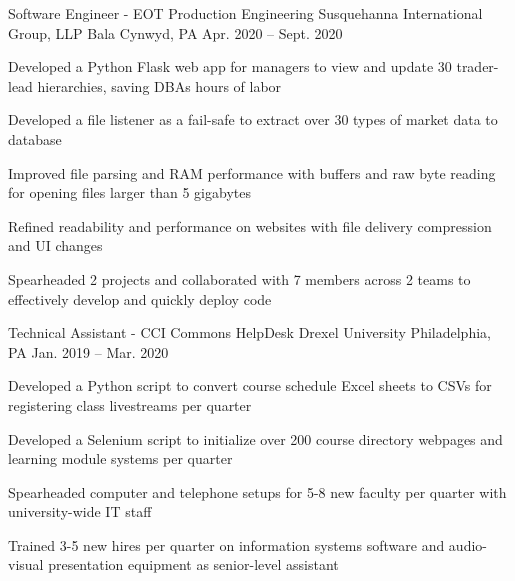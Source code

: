 

\begin{cventries}

  \cventry
  {Software Engineer - EOT Production Engineering} %
  {Susquehanna International Group, LLP} %
  {Bala Cynwyd, PA} %
  {Apr. 2020 -- Sept. 2020} %
  {
    \begin{cvitems} %
      \item {Developed a Python Flask web app for managers to view and update 30 trader-lead hierarchies, saving DBAs hours of labor}
      \item {Developed a file listener as a fail-safe to extract over 30 types of market data to database}
      \item {Improved file parsing and RAM performance with buffers and raw byte reading for opening files larger than 5 gigabytes}
      \item {Refined readability and performance on websites with file delivery compression and UI changes}
      \item {Spearheaded 2 projects and collaborated with 7 members across 2 teams to effectively develop and quickly deploy code}
    \end{cvitems}
  }

  \cventry
  {Technical Assistant - CCI Commons HelpDesk} %
  {Drexel University} %
  {Philadelphia, PA} %
  {Jan. 2019 -- Mar. 2020} %
  {
    \begin{cvitems} %
      \item {Developed a Python script to convert course schedule Excel sheets to CSVs for registering class livestreams per quarter}
      \item {Developed a Selenium script to initialize over 200 course directory webpages and learning module systems per quarter}
      \item {Spearheaded computer and telephone setups for 5-8 new faculty per quarter with university-wide IT staff}
      \item {Trained 3-5 new hires per quarter on information systems software and audio-visual presentation equipment as senior-level assistant}
    \end{cvitems}
  }

\end{cventries}
